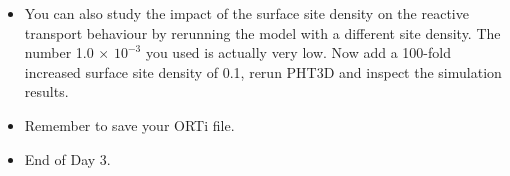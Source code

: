 \begin{itemize}
\item You can also study the impact of the surface site density on the reactive transport behaviour by rerunning the model with a different site density. The number 1.0 $\times$ $10^{-3}$ you used is actually very low. Now add a 100-fold increased surface site density of 0.1, rerun PHT3D and inspect the simulation results.

\item Remember to save your ORTi file.

\item End of Day 3.

\end{itemize}